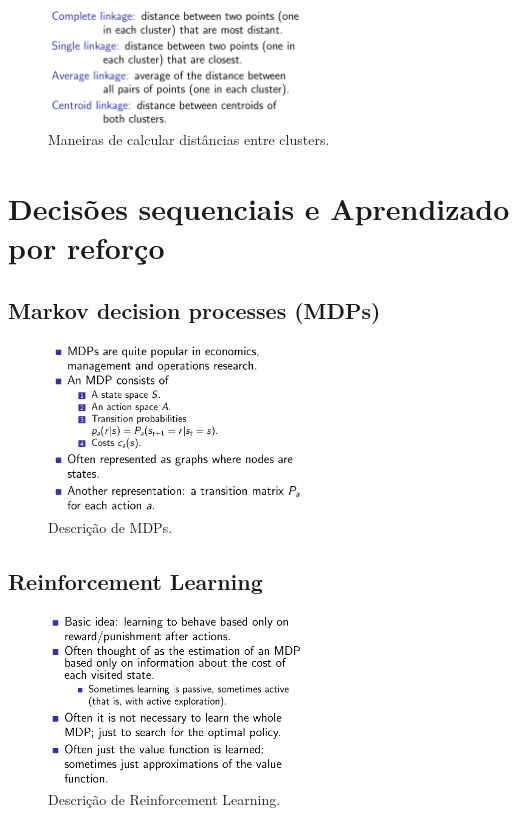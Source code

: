 \documentclass[a4paper,fleqn,12pt]{article}
\begin{document}
\begin{figure}[H]
\centering
\includegraphics[width=0.6\textwidth]{fig/hierarchical_distances.png}
\caption{Maneiras de calcular distâncias entre clusters.}
\label{fig:hierarchical_distances}
\end{figure}

\section{Decisões sequenciais e Aprendizado por reforço}

\subsection{Markov decision processes (MDPs)}

\begin{figure}[H]
\centering
\includegraphics[width=0.6\textwidth]{fig/mdps.png}
\caption{Descrição de MDPs.}
\label{fig:mdps}
\end{figure}

\subsection{Reinforcement Learning}

\begin{figure}[H]
\centering
\includegraphics[width=0.6\textwidth]{fig/reinforcement.png}
\caption{Descrição de Reinforcement Learning.}
\label{fig:reinforcement}
\end{figure}
\end{document}
